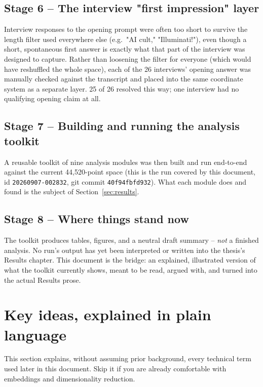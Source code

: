 \documentclass[11pt,a4paper]{article}
\begin{document}
\subsection{Stage 6 -- The interview "first impression" layer}
Interview responses to the opening prompt were often too short to
survive the length filter used everywhere else (e.g.\ "AI cult,"
"Illuminati!"), even though a short, spontaneous first answer is exactly
what that part of the interview was designed to capture. Rather than
loosening the filter for everyone (which would have reshuffled the whole
space), each of the 26 interviews' opening answer was manually checked
against the transcript and placed into the same coordinate system as a
separate layer. 25 of 26 resolved this way; one interview had no
qualifying opening claim at all.

\subsection{Stage 7 -- Building and running the analysis toolkit}
A reusable toolkit of nine analysis modules was then built and run
end-to-end against the current 44,520-point space (this is the run
covered by this document, id \texttt{20260907-002832}, git commit
\texttt{40f94fbfd932}). What each module does and found is the subject
of Section~\ref{sec:results}.

\subsection{Stage 8 -- Where things stand now}
The toolkit produces tables, figures, and a neutral draft summary --
\emph{not} a finished analysis. No run's output has yet been interpreted
or written into the thesis's Results chapter. This document is the
bridge: an explained, illustrated version of what the toolkit currently
shows, meant to be read, argued with, and turned into the actual
Results prose.

\section{Key ideas, explained in plain language}
\label{sec:jargon}

This section explains, without assuming prior background, every
technical term used later in this document. Skip it if you are already
comfortable with embeddings and dimensionality reduction.
\end{document}
